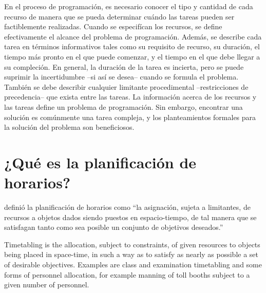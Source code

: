 \documentclass[draft,12pt,headsepline,footsepline,paper=letter]{scrreprt}
\begin{document}
En el proceso de programación, es necesario conocer el tipo y cantidad de cada recurso de manera que se pueda determinar cuándo las tareas pueden ser factiblemente realizadas. Cuando se especifícan los recursos, se define efectivamente el alcance del problema de programación. Además, se describe cada tarea en términos informativos tales como su requisito de recurso, su duración, el tiempo más pronto en el que puede comenzar, y el tiempo en el que debe llegar a su compleción.
En general, la duración de la tarea es incierta, pero se puede suprimir la incertidumbre –si así se desea– cuando se formula el problema. También se debe describir cualquier limitante procedimental –restricciones de precedencia– que exista entre las tareas. La información acerca de los recursos y las tareas define un problema de programación. Sin embargo, encontrar una solución es comúnmente una tarea compleja, y los planteamientos formales para la solución del problema son beneficiosos.

\section{¿Qué es la planificación de horarios?}
\label{sec:planificacion_horarios}

\citet[p.~53]{wren95scheduling-timetabling} definió la planificación de horarios como “la asignación, sujeta a limitantes, de recursos a objetos dados siendo puestos en espacio-tiempo, de tal manera que se satisfagan tanto como sea posible un conjunto de objetivos deseados.”

\iffalse
Timetabling is the allocation, subject to constraints, of given resources to objects being placed in space-time, in such a way as to satisfy as nearly as possible a set of desirable objectives. Examples are class and examination timetabling and some forms of personnel allocation, for example manning of toll booths subject to a given number of personnel.
\end{document}
